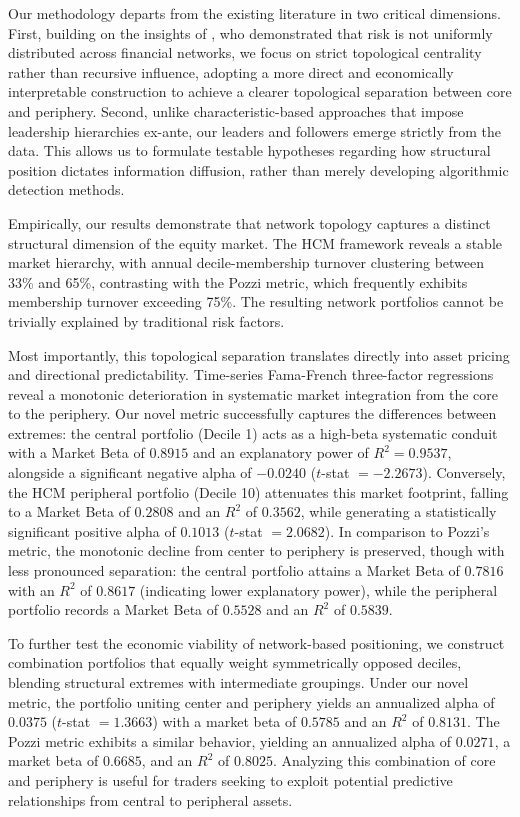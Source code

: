 \documentclass[fleqn]{rbfin}
\begin{document}
Our methodology departs from the existing literature in two critical dimensions. First, building on the insights of \citet{pozzi2013spread}, who demonstrated that risk is not uniformly distributed across financial networks, we focus on strict topological centrality rather than recursive influence, adopting a more direct and economically interpretable construction to achieve a clearer topological separation between core and periphery. Second, unlike characteristic-based approaches that impose leadership hierarchies ex-ante, our leaders and followers emerge strictly from the data. This allows us to formulate testable hypotheses regarding how structural position dictates information diffusion, rather than merely developing algorithmic detection methods.

Empirically, our results demonstrate that network topology captures a distinct structural dimension of the equity market. The HCM framework reveals a stable market hierarchy, with annual decile-membership turnover clustering between 33\% and 65\%, contrasting with the Pozzi metric, which frequently exhibits membership turnover exceeding 75\%. The resulting network portfolios cannot be trivially explained by traditional risk factors.

Most importantly, this topological separation translates directly into asset pricing and directional predictability. Time-series Fama-French three-factor regressions reveal a monotonic deterioration in systematic market integration from the core to the periphery. Our novel metric successfully captures the differences between extremes: the central portfolio (Decile 1) acts as a high-beta systematic conduit with a Market Beta of $0.8915$ and an explanatory power of $R^2 = 0.9537$, alongside a significant negative alpha of $-0.0240$ ($t$-stat $=-2.2673$). Conversely, the HCM peripheral portfolio (Decile 10) attenuates this market footprint, falling to a Market Beta of $0.2808$ and an $R^2$ of $0.3562$, while generating a statistically significant positive alpha of $0.1013$ ($t$-stat $= 2.0682$). In comparison to Pozzi's metric, the monotonic decline from center to periphery is preserved, though with less pronounced separation: the central portfolio attains a Market Beta of $0.7816$ with an $R^2$ of $0.8617$ (indicating lower explanatory power), while the peripheral portfolio records a Market Beta of $0.5528$ and an $R^2$ of $0.5839$. 

To further test the economic viability of network-based positioning, we construct combination portfolios that equally weight symmetrically opposed deciles, blending structural extremes with intermediate groupings. Under our novel metric, the portfolio uniting center and periphery yields an annualized alpha of $0.0375$ ($t$-stat $= 1.3663$) with a market beta of $0.5785$ and an $R^2$ of $0.8131$. The Pozzi metric exhibits a similar behavior, yielding an annualized alpha of $0.0271$, a market beta of $0.6685$, and an $R^2$ of $0.8025$. Analyzing this combination of core and periphery is useful for traders seeking to exploit potential predictive relationships from central to peripheral assets.
\end{document}
